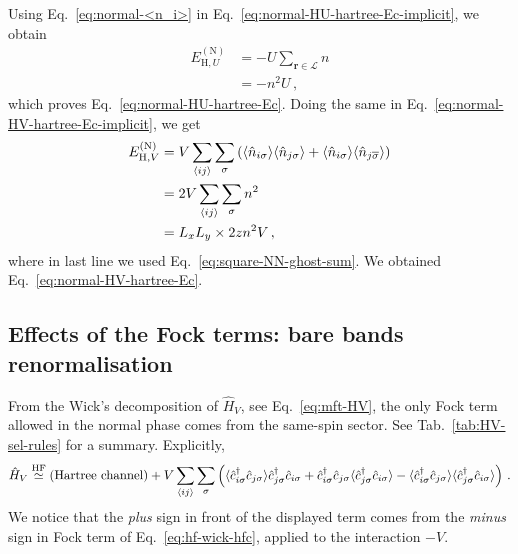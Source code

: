 \begin{tabproof}
	
	Using Eq.~\eqref{eq:normal-<n_i>} in Eq.~\eqref{eq:normal-HU-hartree-Ec-implicit}, we obtain
	\[
	\begin{aligned}
		E_{\mathrm{H},U}^{(\mathrm{N})} &= -U \sum_{\mathbf{r} \in \mathcal{L}} n \\
		&= -n^2 U \, ,
	\end{aligned}
	\]
	which proves Eq.~\eqref{eq:normal-HU-hartree-Ec}. Doing the same in Eq.~\eqref{eq:normal-HV-hartree-Ec-implicit}, we get
	\[
	\begin{aligned}	
		E_{\mathrm{H},V}^{(\mathrm{N})} &= V \sum_{\ev{ij}} \sum_\sigma \left(
		\langle 
		\hat n_{i\sigma}
		\rangle \langle 
		\hat n_{j\sigma}
		\rangle
		+
		\langle 
		\hat n_{i\sigma}
		\rangle \langle 
		\hat n_{j\overline{\sigma}}
		\rangle
		\right) \\
		&= 2V \sum_{\ev{ij}} \sum_\sigma n^2 \\
		&= L_x L_y \times 2zn^2 V \, , 
	\end{aligned}
	\]
	where in last line we used Eq.~\eqref{eq:square-NN-ghost-sum}. We obtained Eq.~\eqref{eq:normal-HV-hartree-Ec}.
\end{tabproof}

\subsection{Effects of the Fock terms: bare bands renormalisation}\label{subsec:normal-fock-bands}
 
From the Wick's decomposition of $\hat H_V$, see Eq.~\eqref{eq:mft-HV}, the only Fock term allowed in the normal phase comes from the same-spin sector. See Tab.~\ref{tab:HV-sel-rules} for a summary. Explicitly,
\begin{equation}\label{eq:normal-HV-fock}
	\hat H_V \HFsimeq (\text{Hartree channel}) + 
	V \sum_{\ev{ij}} \sum_\sigma \left(
		\langle
		\hat c_{i\sigma}^\dagger \hat c_{j\sigma}
		\rangle \hat c_{j\sigma}^\dagger  \hat c_{i\sigma} + 
		\hat c_{i\sigma}^\dagger \hat c_{j\sigma}
		\langle \hat c_{j\sigma}^\dagger  \hat c_{i\sigma} \rangle - \langle \hat c_{i\sigma}^\dagger \hat c_{j\sigma}
		\rangle \langle \hat c_{j\sigma}^\dagger  \hat c_{i\sigma} \rangle
	\right) \, .
\end{equation}
We notice that the \textit{plus} sign in front of the displayed term comes from the \textit{minus} sign in Fock term of Eq.~\eqref{eq:hf-wick-hfc}, applied to the interaction $-V$.

